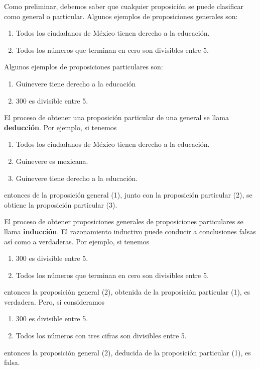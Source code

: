 Como preliminar, debemos saber que cualquier proposición se puede clasificar como general o particular. Algunos ejemplos de proposiciones generales son:
\begin{enumerate}
    \item Todos los ciudadanos de México tienen derecho a la educación.
    \item Todos los números que terminan en cero son divisibles entre 5.
\end{enumerate}
Algunos ejemplos de proposiciones particulares son:
\begin{enumerate}
    \item Guinevere tiene derecho a la educación 
    \item 300 es divisible entre 5.
\end{enumerate}
El proceso de obtener una proposición particular de una general se llama \textbf{deducción}. Por ejemplo, si tenemos
\begin{enumerate}
    \item Todos los ciudadanos de México tienen derecho a la educación.
    \item Guinevere es mexicana.
    \item Guinevere tiene derecho a la educación.
\end{enumerate}
entonces de la proposición general (1), junto con la proposición particular (2), se obtiene la proposición particular (3).

El proceso de obtener proposiciones generales de proposiciones particulares se llama \textbf{inducción}. El razonamiento inductivo puede conducir a conclusiones falsas así como a verdaderas. Por ejemplo, si tenemos
\begin{enumerate}
    \item 300 es divisible entre 5.
    \item Todos los números que terminan en cero son divisibles entre 5.
\end{enumerate}
entonces la proposición general (2), obtenida de la proposición particular (1), es verdadera. Pero, si consideramos
\begin{enumerate}
    \item 300 es divisible entre 5.
    \item Todos los números con tres cifras son divisibles entre 5.
\end{enumerate}
entonces la proposición general (2), deducida de la proposición particular (1), es falsa.

